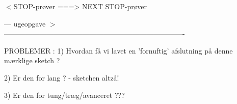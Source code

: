 \documentclass[a4paper,11pt]{article}
\begin{document}
\begin{sketch}
       $<$STOP-prøver ===>  NEXT STOP-prøver { ---  ugeopgave $>$\\


         ----------------------------------------------------------------------------




         PROBLEMER :
         1) Hvordan få vi lavet en 'fornuftig' afslutning 
         på denne mærklige sketch ?


         2) Er den for lang ? - sketchen altzå!


         3) Er den for tung/træg/avanceret ???
}
\end{sketch}
\end{document}
